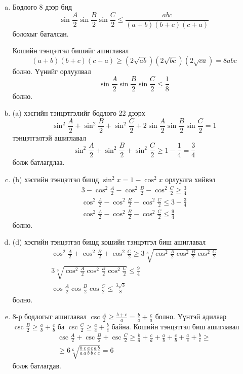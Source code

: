 \documentclass[10pt,a4paper,oneside]{book}
\begin{document}
\TheSolution
\begin{enumerate}[(a)]
\item
Бодлого 8 дээр бид 
\begin{equation*}
\sin \frac{A}{2} \sin \frac{B}{2} \sin \frac{C}{2} \leq \frac{abc}{(a+b)(b+c)(c+a)}
\end{equation*}
болохыг баталсан.

Кошийн тэнцэтгэл бишийг ашиглавал
\begin{equation*}
(a+b)(b+c)(c+a) \geq (2\sqrt{ab})(2\sqrt{bc})(2\sqrt{ca}) = 8abc
\end{equation*}
болно. Үүнийг орлуулвал
\begin{equation*}
\sin \frac{A}{2} \sin \frac{B}{2} \sin \frac{C}{2} \leq \frac{1}{8}
\end{equation*}
болно.
\item
(a) хэсгийн тэнцэтгэлийг бодлого 22 дээрх
\begin{equation*}
\sin^2 \frac{A}{2} + \sin^2 \frac{B}{2} + \sin^2 \frac{C}{2} + 2\sin \frac{A}{2}\sin \frac{B}{2} \sin \frac{C}{2} = 1
\end{equation*}
тэнцэтгэлтэй ашиглавал
\begin{equation*}
\sin^2 \frac{A}{2} + \sin^2 \frac{B}{2} + \sin^2 \frac{C}{2} \geq 1-\frac{1}{4} = \frac{3}{4}
\end{equation*}
болж батлагдлаа.
\item
(b) хэсгийн тэнцэтгэл бишд $\sin^2 x = 1-\cos^2 x$ орлуулга хийвэл
\begin{align*}
3 - \cos^2 \frac{A}{2} - \cos^2 \frac{B}{2} - \cos^2 \frac{C}{2} \geq \frac{3}{4} \\
\cos^2 \frac{A}{2} - \cos^2 \frac{B}{2} - \cos^2 \frac{C}{2} \leq 3- \frac{3}{4}\\
\cos^2 \frac{A}{2} - \cos^2 \frac{B}{2} - \cos^2 \frac{C}{2} \leq \frac{9}{4}
\end{align*}
болно.
\item
(d) хэсгийн тэнцэтгэл бишд кошийн тэнцэтгэл биш ашиглавал
\begin{align*}
\cos^2 \frac{A}{2} + \cos^2 \frac{B}{2} + \cos^2 \frac{C}{2} \geq 3\sqrt[3]{\cos^2 \frac{A}{2}\cos^2 \frac{B}{2} \cos^2 \frac{C}{2}}\\
3\sqrt[3]{\cos^2 \frac{A}{2}\cos^2 \frac{B}{2} \cos^2 \frac{C}{2}} \leq \frac{9}{4} \\
\cos \frac{A}{2} \cos \frac{B}{2} \cos \frac{C}{2} \leq \frac{3\sqrt{3}}{8}
\end{align*}
болно.
\item
8-р бодлогыг ашиглавал $\csc \frac{A}{2} \geq \frac{b+c}{a} = \frac{b}{a} + \frac{c}{a}$ болно. Үүнтэй адилаар $\csc \frac{B}{2} \geq \frac{a}{b} + \frac{c}{b}$ ба $\csc \frac{C}{2} \geq \frac{a}{c}+\frac{b}{c}$ байна. Кошийн тэнцэтгэл биш ашиглавал
\begin{align*}
\csc \frac{A}{2} + \csc \frac{B}{2} + \csc \frac{C}{2} \geq \frac{b}{a} + \frac{c}{a} + \frac{a}{b} + \frac{c}{b} + \frac{a}{c} + \frac{b}{c} \geq\\
\geq 6\sqrt[6]{\frac{b}{a}\frac{c}{a}\frac{a}{b}\frac{c}{b}\frac{a}{c}\frac{b}{c}} = 6
\end{align*}
болж батлагдав.
\end{enumerate}
\end{document}
